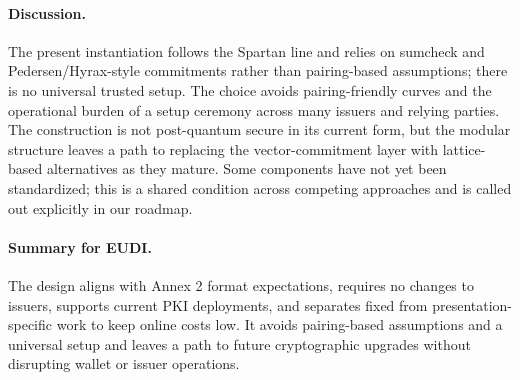 \paragraph{Discussion.}
The present instantiation follows the Spartan line and relies on sumcheck and Pedersen/Hyrax-style commitments rather than pairing-based assumptions; there is no universal trusted setup. The choice avoids pairing-friendly curves and the operational burden of a setup ceremony across many issuers and relying parties. The construction is not post-quantum secure in its current form, but the modular structure leaves a path to replacing the vector-commitment layer with lattice-based alternatives as they mature. Some components have not yet been standardized; this is a shared condition across competing approaches and is called out explicitly in our roadmap.

\paragraph{Summary for EUDI.}
The design aligns with Annex 2 format expectations, requires no changes to issuers, supports current PKI deployments, and separates fixed from presentation-specific work to keep online costs low. It avoids pairing-based assumptions and a universal setup and leaves a path to future cryptographic upgrades without disrupting wallet or issuer operations.

